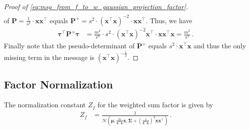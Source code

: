 \documentclass[a4paper]{article}
\newcommand{\Normal}[3]{{\mathcal N} \left({#1};{#2},{#3}\right)}
\newcommand{\bs}[1]{{\boldsymbol{#1}}}
\newcommand{\transpose}[1]{{#1}^\top}
\theoremstyle{definition}
\begin{document}
\begin{proof}[Proof of \eqref{eq:msg_from_f_to_w_gaussian_projection_factor}]
{\begin{align*}
    \end{align*}
    } of $\bs{P} = \frac{1}{s^2} \cdot \bs{x}\transpose{\bs{x}}$ equals $\bs{P}^+ = s^2 \cdot (\transpose{\bs{x}}\bs{x})^{-2} \cdot \bs{x}\transpose{\bs{x}}$. Thus, we have
    \begin{align*}
        \transpose{\bs{\tau}}\bs{P}^+\bs{\tau} 
        & = \frac{m^2}{s^4} \cdot s^2 \cdot (\transpose{\bs{x}}\bs{x})^{-2} \transpose{\bs{x}} \cdot \bs{x}\transpose{\bs{x}}\bs{x} = \frac{m^2}{s^2} \,.
    \end{align*}
    Finally note that the pseudo-determinant of $\bs{P}^+$ equals $s^2 \cdot \transpose{\bs{x}}\bs{x}$ and thus the only missing term in the message is $(\transpose{\bs{x}}\bs{x})^{-\frac{1}{2}}$.
\end{proof}

\subsection*{Factor Normalization}
The normalization constant $Z_{f}$ for the weighted sum factor is given by
\begin{align}
    Z_{f} & = \frac{1}{\Normal{\bs{\mu}}{\frac{m}{\transpose{\bs{x}}\bs{x}} \bs{x}}{\bs{\Sigma} + \left(\frac{s}{\transpose{\bs{x}}\bs{x}}\right)^2 \bs{x}\transpose{\bs{x}}}} \,.
\end{align}
\end{document}
